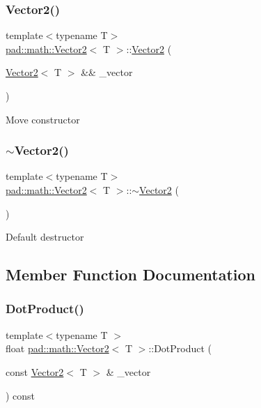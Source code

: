 \subsubsection{\texorpdfstring{Vector2()}{Vector2()}\hspace{0.1cm}{\footnotesize\ttfamily [5/5]}}
{\footnotesize\ttfamily template$<$typename T$>$ \\
\mbox{\hyperlink{structpad_1_1math_1_1_vector2}{pad\+::math\+::\+Vector2}}$<$ T $>$\+::\mbox{\hyperlink{structpad_1_1math_1_1_vector2}{Vector2}} (\begin{DoxyParamCaption}\item[{\mbox{\hyperlink{structpad_1_1math_1_1_vector2}{Vector2}}$<$ T $>$ \&\&}]{\+\_\+vector }\end{DoxyParamCaption})\hspace{0.3cm}{\ttfamily [default]}}

Move constructor \mbox{\label{structpad_1_1math_1_1_vector2_afb8d7ff79388a1d6fcf2e54a5303bf39}} 
\subsubsection{\texorpdfstring{$\sim$\+Vector2()}{~Vector2()}}
{\footnotesize\ttfamily template$<$typename T$>$ \\
\mbox{\hyperlink{structpad_1_1math_1_1_vector2}{pad\+::math\+::\+Vector2}}$<$ T $>$\+::$\sim$\mbox{\hyperlink{structpad_1_1math_1_1_vector2}{Vector2}} (\begin{DoxyParamCaption}{ }\end{DoxyParamCaption})\hspace{0.3cm}{\ttfamily [default]}}

Default destructor 

\subsection{Member Function Documentation}
\mbox{\label{structpad_1_1math_1_1_vector2_a4e06866137ababf33fafbad672c77e75}} 
\subsubsection{\texorpdfstring{Dot\+Product()}{DotProduct()}}
{\footnotesize\ttfamily template$<$typename T $>$ \\
float \mbox{\hyperlink{structpad_1_1math_1_1_vector2}{pad\+::math\+::\+Vector2}}$<$ T $>$\+::Dot\+Product (\begin{DoxyParamCaption}\item[{const \mbox{\hyperlink{structpad_1_1math_1_1_vector2}{Vector2}}$<$ T $>$ \&}]{\+\_\+vector }\end{DoxyParamCaption}) const}

